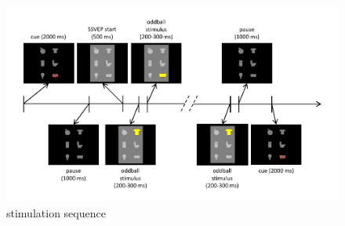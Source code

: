 

\clearpage

\begin{figure}[t]
\centering
\includegraphics{pix/stimulationSequence}
\caption{stimulation sequence}
\label{fig:stimSeq}
\end{figure}